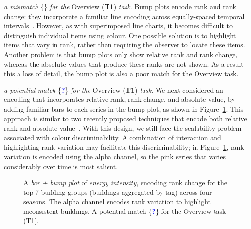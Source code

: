 \documentclass[journal]{vgtc}                %
\newcommand*\mismatch{\textcolor{red}{\ding{54}}}
\newcommand*\posmatch{\textcolor{blue}{{\bf ?}}}
\newcommand{\bstart}[1]{\vspace{1mm} \noindent{\textbf{#1:}}}
\begin{document}
\bstart{Bump plots} {\it a mismatch} \{\mismatch\} {\it for the} Overview ({\bf T1}) {\it task}.
Bump plots encode rank and rank change; they incorporate a familiar line encoding across equally-spaced temporal intervals~\cite{Tufte1990}. 
However, as with superimposed line charts, it becomes difficult to distinguish individual items using colour.
One possible solution is to highlight items that vary in rank, rather than requiring the observer to locate these items.
Another problem is that bump plots only show relative rank and rank change, whereas the absolute values that produce these ranks are not shown. 
As a result this a loss of detail, the bump plot is also a poor match for the Overview task.

\bstart{Bump + bar plots} {\it a potential match} \{\posmatch\} {\it for the} Overview ({\bf T1}) {\it task}.
We next considered an encoding that incorporates relative rank, rank change, and absolute value, by adding familiar bars to each series in the bump plot, as shown in Figure~\ref{fig:sandbox-barbump}. 
This approach is similar to two recently proposed techniques that encode both relative rank and absolute value~\cite{Gratzl2013,Hur2013}. 
With this design, we still face the scalability problem associated with colour discriminability.
A combination of interaction and highlighting rank variation may facilitate this discriminability; in Figure~\ref{fig:sandbox-barbump}, rank variation is encoded using the alpha channel, so the pink series that varies considerably over time is most salient.

\begin{figure}[ht]
    \vspace{-0.3cm}
	\centering
	\vspace{-0.15cm}
	\caption{A \textsl{bar + bump plot} of \textsl{energy intensity}, encoding rank change for the top 7 building groups (buildings aggregated by tag) across four seasons. The alpha channel encodes rank variation to highlight inconsistent buildings. A potential match  \{\posmatch\} for the Overview task (T1).}
	\label{fig:sandbox-barbump}
	\vspace{-0.3cm}
\end{figure}
\end{document}
